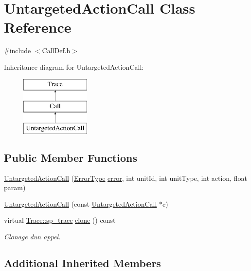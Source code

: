 \hypertarget{class_untargeted_action_call}{}\section{Untargeted\+Action\+Call Class Reference}
\label{class_untargeted_action_call}


{\ttfamily \#include $<$Call\+Def.\+h$>$}

Inheritance diagram for Untargeted\+Action\+Call\+:\begin{figure}[H]
\begin{center}
\leavevmode
\includegraphics[height=3.000000cm]{class_untargeted_action_call}
\end{center}
\end{figure}
\subsection*{Public Member Functions}
\begin{DoxyCompactItemize}
\item 
\hyperlink{class_untargeted_action_call_aef6fd05ef0cab0c062feb64967e3e7c2}{Untargeted\+Action\+Call} (\hyperlink{class_call_ade833a08ce215aaa4121102f3448c898}{Error\+Type} \hyperlink{class_call_a206f6150a8038fda48c17c2c7421aed1}{error}, int unit\+Id, int unit\+Type, int action, float param)
\item 
\hyperlink{class_untargeted_action_call_ae888d621e1616e1e6a4aa427f1e5b2d5}{Untargeted\+Action\+Call} (const \hyperlink{class_untargeted_action_call}{Untargeted\+Action\+Call} $\ast$c)
\item 
virtual \hyperlink{class_trace_a9c58e523529fc8a03fb6acf3eef86150}{Trace\+::sp\+\_\+trace} \hyperlink{class_untargeted_action_call_a483d86c01a984c4b1e59e339a1f7329e}{clone} () const 
\begin{DoxyCompactList}\small\item\em Clonage d\textquotesingle{}un appel. \end{DoxyCompactList}\end{DoxyCompactItemize}
\subsection*{Additional Inherited Members}



